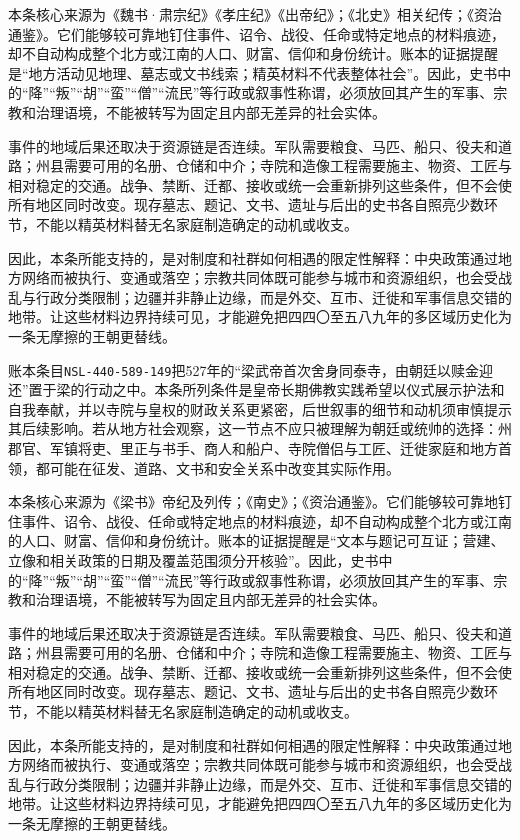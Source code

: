 本条核心来源为《魏书·肃宗纪》《孝庄纪》《出帝纪》；《北史》相关纪传；《资治通鉴》。它们能够较可靠地钉住事件、诏令、战役、任命或特定地点的材料痕迹，却不自动构成整个北方或江南的人口、财富、信仰和身份统计。账本的证据提醒是“地方活动见地理、墓志或文书线索；精英材料不代表整体社会”。因此，史书中的“降”“叛”“胡”“蛮”“僧”“流民”等行政或叙事性称谓，必须放回其产生的军事、宗教和治理语境，不能被转写为固定且内部无差异的社会实体。

事件的地域后果还取决于资源链是否连续。军队需要粮食、马匹、船只、役夫和道路；州县需要可用的名册、仓储和中介；寺院和造像工程需要施主、物资、工匠与相对稳定的交通。战争、禁断、迁都、接收或统一会重新排列这些条件，但不会使所有地区同时改变。现存墓志、题记、文书、遗址与后出的史书各自照亮少数环节，不能以精英材料替无名家庭制造确定的动机或收支。

因此，本条所能支持的，是对制度和社群如何相遇的限定性解释：中央政策通过地方网络而被执行、变通或落空；宗教共同体既可能参与城市和资源组织，也会受战乱与行政分类限制；边疆并非静止边缘，而是外交、互市、迁徙和军事信息交错的地带。让这些材料边界持续可见，才能避免把四四〇至五八九年的多区域历史化为一条无摩擦的王朝更替线。

账本条目\texttt{NSL-440-589-149}把527年的“梁武帝首次舍身同泰寺，由朝廷以赎金迎还”置于梁的行动之中。本条所列条件是皇帝长期佛教实践希望以仪式展示护法和自我奉献，并以寺院与皇权的财政关系更紧密，后世叙事的细节和动机须审慎提示其后续影响。若从地方社会观察，这一节点不应只被理解为朝廷或统帅的选择：州郡官、军镇将吏、里正与书手、商人和船户、寺院僧侣与工匠、迁徙家庭和地方首领，都可能在征发、道路、文书和安全关系中改变其实际作用。

本条核心来源为《梁书》帝纪及列传；《南史》；《资治通鉴》。它们能够较可靠地钉住事件、诏令、战役、任命或特定地点的材料痕迹，却不自动构成整个北方或江南的人口、财富、信仰和身份统计。账本的证据提醒是“文本与题记可互证；营建、立像和相关政策的日期及覆盖范围须分开核验”。因此，史书中的“降”“叛”“胡”“蛮”“僧”“流民”等行政或叙事性称谓，必须放回其产生的军事、宗教和治理语境，不能被转写为固定且内部无差异的社会实体。

事件的地域后果还取决于资源链是否连续。军队需要粮食、马匹、船只、役夫和道路；州县需要可用的名册、仓储和中介；寺院和造像工程需要施主、物资、工匠与相对稳定的交通。战争、禁断、迁都、接收或统一会重新排列这些条件，但不会使所有地区同时改变。现存墓志、题记、文书、遗址与后出的史书各自照亮少数环节，不能以精英材料替无名家庭制造确定的动机或收支。

因此，本条所能支持的，是对制度和社群如何相遇的限定性解释：中央政策通过地方网络而被执行、变通或落空；宗教共同体既可能参与城市和资源组织，也会受战乱与行政分类限制；边疆并非静止边缘，而是外交、互市、迁徙和军事信息交错的地带。让这些材料边界持续可见，才能避免把四四〇至五八九年的多区域历史化为一条无摩擦的王朝更替线。

